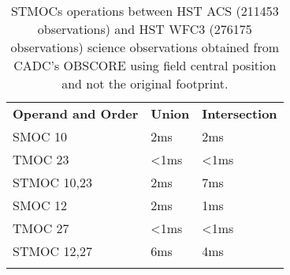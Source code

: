 \begin{table}[!htbp]
\begin{center}
{\scriptsize
\begin{tabular}{p{}p{}p{}}
\sptablerule
\textbf{Operand and Order} & \textbf{Union} & \textbf{Intersection} \\
\sptablerule
SMOC 10	&2ms&	2ms \\
TMOC 23&	<1ms&	<1ms \\
STMOC 10,23&	2ms&	7ms \\
SMOC 12&	2ms&	1ms \\
TMOC 27&	<1ms&	<1ms \\
STMOC 12,27&	6ms&	4ms \\
\sptablerule
\end{tabular}
\caption[STMOC operation performances]{STMOCs operations between HST ACS (211453 observations) and HST WFC3 (276175 observations) science observations obtained from CADC's OBSCORE using field central position and not the original footprint.}
\normalsize
\label{table:stmocopsacs}
}
\end{center}
\end{table}
